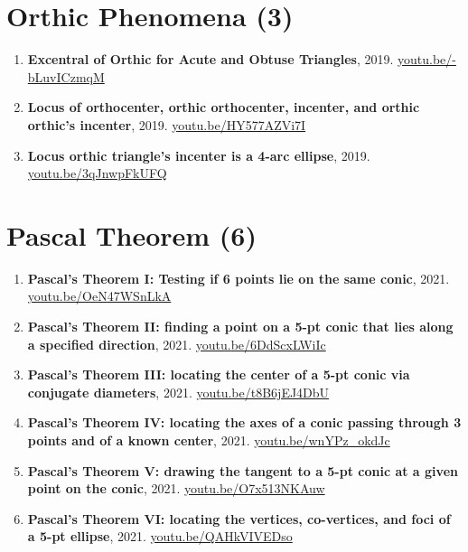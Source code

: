 \documentclass[12pt]{article}
\begin{document}
\section{Orthic Phenomena (3)}

\begin{enumerate}[resume]
\item \textbf{Excentral of Orthic for Acute and Obtuse Triangles}, 2019. \href{https://youtu.be/-bLuvICzmqM}{\url{youtu.be/-bLuvICzmqM}}
\item \textbf{Locus of orthocenter, orthic orthocenter, incenter, and orthic orthic's incenter}, 2019. \href{https://youtu.be/HY577AZVi7I}{\url{youtu.be/HY577AZVi7I}}
\item \textbf{Locus orthic triangle's incenter is a 4-arc ellipse}, 2019. \href{https://youtu.be/3qJnwpFkUFQ}{\url{youtu.be/3qJnwpFkUFQ}}
\end{enumerate}

\section{Pascal Theorem (6)}

\begin{enumerate}[resume]
\item \textbf{Pascal's Theorem I: Testing if 6 points lie on the same conic}, 2021. \href{https://youtu.be/OeN47WSnLkA}{\url{youtu.be/OeN47WSnLkA}}
\item \textbf{Pascal's Theorem II: finding a point on a 5-pt conic that lies along a specified direction}, 2021. \href{https://youtu.be/6DdScxLWiIc}{\url{youtu.be/6DdScxLWiIc}}
\item \textbf{Pascal's Theorem III: locating the center of a 5-pt conic via conjugate diameters}, 2021. \href{https://youtu.be/t8B6jEJ4DbU}{\url{youtu.be/t8B6jEJ4DbU}}
\item \textbf{Pascal's Theorem IV: locating the axes of a conic passing through 3 points and of a known center}, 2021. \href{https://youtu.be/wnYPz_okdJc}{\url{youtu.be/wnYPz\_okdJc}}
\item \textbf{Pascal's Theorem V: drawing the tangent to a 5-pt conic at a given point on the conic}, 2021. \href{https://youtu.be/O7x513NKAuw}{\url{youtu.be/O7x513NKAuw}}
\item \textbf{Pascal's Theorem VI: locating the vertices, co-vertices, and foci of a 5-pt ellipse}, 2021. \href{https://youtu.be/QAHkVIVEDso}{\url{youtu.be/QAHkVIVEDso}}
\end{enumerate}
\end{document}
